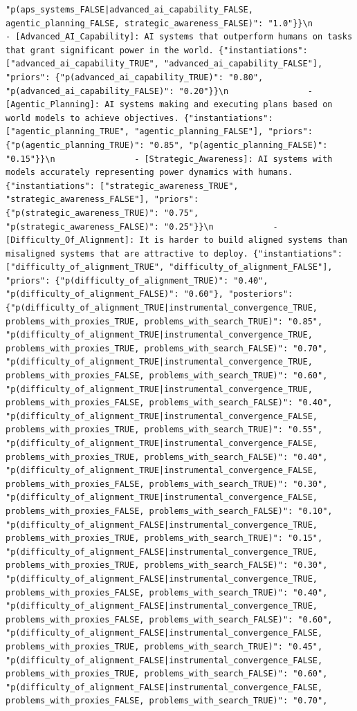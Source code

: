 \documentclass[
  11pt,
  letterpaper,
]{book}
\begin{document}
\begin{verbatim}
"p(aps_systems_FALSE|advanced_ai_capability_FALSE, agentic_planning_FALSE, strategic_awareness_FALSE)": "1.0"}}\n                - [Advanced_AI_Capability]: AI systems that outperform humans on tasks that grant significant power in the world. {"instantiations": ["advanced_ai_capability_TRUE", "advanced_ai_capability_FALSE"], "priors": {"p(advanced_ai_capability_TRUE)": "0.80", "p(advanced_ai_capability_FALSE)": "0.20"}}\n                - [Agentic_Planning]: AI systems making and executing plans based on world models to achieve objectives. {"instantiations": ["agentic_planning_TRUE", "agentic_planning_FALSE"], "priors": {"p(agentic_planning_TRUE)": "0.85", "p(agentic_planning_FALSE)": "0.15"}}\n                - [Strategic_Awareness]: AI systems with models accurately representing power dynamics with humans. {"instantiations": ["strategic_awareness_TRUE", "strategic_awareness_FALSE"], "priors": {"p(strategic_awareness_TRUE)": "0.75", "p(strategic_awareness_FALSE)": "0.25"}}\n            - [Difficulty_Of_Alignment]: It is harder to build aligned systems than misaligned systems that are attractive to deploy. {"instantiations": ["difficulty_of_alignment_TRUE", "difficulty_of_alignment_FALSE"], "priors": {"p(difficulty_of_alignment_TRUE)": "0.40", "p(difficulty_of_alignment_FALSE)": "0.60"}, "posteriors": {"p(difficulty_of_alignment_TRUE|instrumental_convergence_TRUE, problems_with_proxies_TRUE, problems_with_search_TRUE)": "0.85", "p(difficulty_of_alignment_TRUE|instrumental_convergence_TRUE, problems_with_proxies_TRUE, problems_with_search_FALSE)": "0.70", "p(difficulty_of_alignment_TRUE|instrumental_convergence_TRUE, problems_with_proxies_FALSE, problems_with_search_TRUE)": "0.60", "p(difficulty_of_alignment_TRUE|instrumental_convergence_TRUE, problems_with_proxies_FALSE, problems_with_search_FALSE)": "0.40", "p(difficulty_of_alignment_TRUE|instrumental_convergence_FALSE, problems_with_proxies_TRUE, problems_with_search_TRUE)": "0.55", "p(difficulty_of_alignment_TRUE|instrumental_convergence_FALSE, problems_with_proxies_TRUE, problems_with_search_FALSE)": "0.40", "p(difficulty_of_alignment_TRUE|instrumental_convergence_FALSE, problems_with_proxies_FALSE, problems_with_search_TRUE)": "0.30", "p(difficulty_of_alignment_TRUE|instrumental_convergence_FALSE, problems_with_proxies_FALSE, problems_with_search_FALSE)": "0.10", "p(difficulty_of_alignment_FALSE|instrumental_convergence_TRUE, problems_with_proxies_TRUE, problems_with_search_TRUE)": "0.15", "p(difficulty_of_alignment_FALSE|instrumental_convergence_TRUE, problems_with_proxies_TRUE, problems_with_search_FALSE)": "0.30", "p(difficulty_of_alignment_FALSE|instrumental_convergence_TRUE, problems_with_proxies_FALSE, problems_with_search_TRUE)": "0.40", "p(difficulty_of_alignment_FALSE|instrumental_convergence_TRUE, problems_with_proxies_FALSE, problems_with_search_FALSE)": "0.60", "p(difficulty_of_alignment_FALSE|instrumental_convergence_FALSE, problems_with_proxies_TRUE, problems_with_search_TRUE)": "0.45", "p(difficulty_of_alignment_FALSE|instrumental_convergence_FALSE, problems_with_proxies_TRUE, problems_with_search_FALSE)": "0.60", "p(difficulty_of_alignment_FALSE|instrumental_convergence_FALSE, problems_with_proxies_FALSE, problems_with_search_TRUE)": "0.70", 
\end{verbatim}
\end{document}
